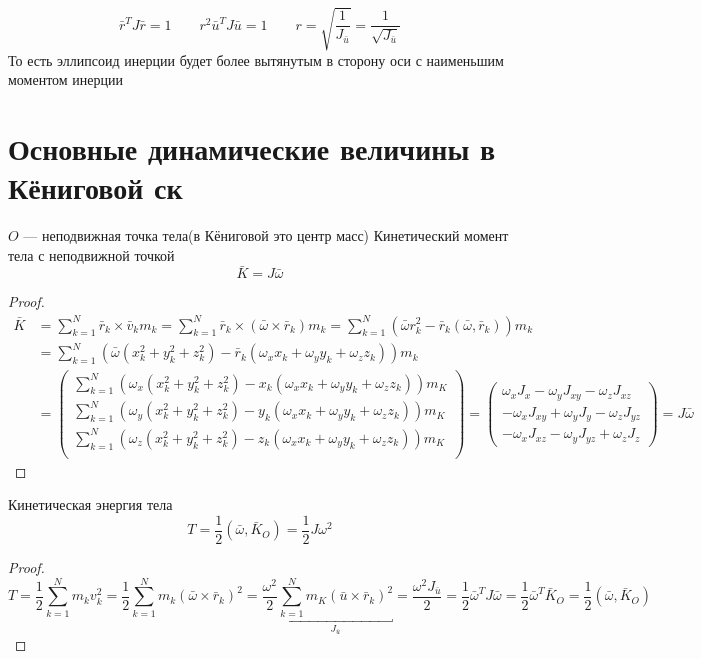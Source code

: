 \documentclass[crop=false]{standalone}
\begin{document}
\noindent \keypoint
\[\bar r^T J \bar r = 1 \qquad r^2 \bar u^T J \bar u = 1 \qquad r = \sqrt{\frac{1}{J_{\bar u}}} = \frac{1}{\sqrt{J_{\bar u}}}\]
То есть эллипсоид инерции будет более вытянутым в сторону оси с наименьшим моментом инерции

\section{Основные динамические величины в Кёниговой ск}
$O$ — неподвижная точка тела(в Кёниговой это центр масс)
\noindent \keypoint
Кинетический момент тела с неподвижной точкой
\[\bar K = J \bar \omega\]
\begin{proof}
\[
\begin{aligned}
\bar K &= \sum_{k=1}^{N} \bar r_k \times \bar v_k m_k = \sum_{k=1}^{N} \bar r_k \times (\bar \omega \times \bar r_k) m_k = \sum_{k=1}^{N} (\bar \omega r_k^2 - \bar r_k (\bar \omega, \bar r_k)) m_k \\
&= \sum_{k=1}^{N} (\bar \omega (x_k^2 + y_k^2 + z_k^2) - \bar r_k (\omega_x x_k + \omega_y y_k + \omega_z z_k)) m_k  \\
&= \begin{pmatrix}
    \sum_{k=1}^{N} \left( \omega _x ( x_k^2 + y_k^2 + z_k^2) - x_k  (\omega_x x_k + \omega_y y_k + \omega_z z_k) \right) m_K \\
    \sum_{k=1}^{N} \left( \omega _y ( x_k^2 + y_k^2 + z_k^2) - y_k  (\omega_x x_k + \omega_y y_k + \omega_z z_k) \right) m_K \\
    \sum_{k=1}^{N} \left( \omega _z ( x_k^2 + y_k^2 + z_k^2) - z_k  (\omega_x x_k + \omega_y y_k + \omega_z z_k) \right) m_K \\
\end{pmatrix} = \begin{pmatrix}
    \omega_x J_x - \omega_y J_{x y} - \omega_z J_{x z} \\
    -\omega_ x J_{x y} + \omega_y J_y - \omega_z J_{y z} \\
    -\omega_x J_{x z} - \omega_y J_{y z} + \omega_z J_z
\end{pmatrix} = J \bar \omega
\end{aligned}
\]
\end{proof}
\noindent \keypoint
Кинетическая энергия тела
\[T = \frac{1}{2} (\bar \omega , \bar K_O) = \frac{1}{2} J \omega^2\]
\begin{proof}
    \[T = \frac{1}{2} \sum_{k=1}^{N} m_k v_k^2 = \frac{1}{2} \sum_{k=1}^{N } m_k (\bar \omega \times \bar r_k)^2 = \frac{\omega^2}{2}  \underbracket{ \sum_{k=1}^{N} m_K(\bar u \times \bar r_k)^2}_{J_{\bar u}}  =  \frac{\omega^2 J_{\bar u}}{2} = \frac{1}{2}\bar \omega^T J \bar \omega = \frac{1}{2} \bar \omega^T \bar K_O = \frac{1}{2} (\bar \omega , \bar K_O)\]
\end{proof}
\end{document}
